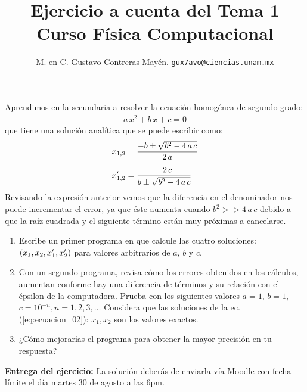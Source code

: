
\usepackage{minted}

\title{\vspace{-2cm}Ejercicio a cuenta del Tema 1 \\ {\large Curso Física Computacional} \vspace{-3ex}}
\author{M. en C. Gustavo Contreras Mayén. \texttt{gux7avo@ciencias.unam.mx}}
\date{}



\fontsize{14}{14}\selectfont
\vspace{-4cm}
\maketitle

Aprendimos en la secundaria a resolver la ecuación homogénea de segundo grado:
\begin{align}
a \, x^{2} + b \, x + c = 0
\label{eq:ecuacion_01}
\end{align}
que tiene una solución analítica que se puede escribir como:
\begin{align}
x_{1,2} &= \dfrac{-b \pm \sqrt{b^{2} - 4 \, a \, c}}{2 \, a} \label{eq:ecuacion_02} \\[0.5em]
{x}^{\prime}_{1,2} &= \dfrac{-2 \, c}{b \pm \sqrt{b^{2} - 4 \, a \, c}} \label{eq:ecuacion_03}
\end{align}
Revisando la expresión anterior vemos que la diferencia en el denominador nos puede incrementar el error, ya que éste aumenta cuando $b^{2} >> 4 \, a \, c$ debido a que la raíz cuadrada y el siguiente término están muy próximas a cancelarse.
\begin{enumerate}
\item Escribe un primer programa en \python{} que calcule las cuatro soluciones: \newline $(x_{1}, x_{2}, {x}^{\prime}_{1}, {x}^{\prime}_{2})$ para valores arbitrarios de $a$, $b$ y $c$.
\item Con un segundo programa, revisa cómo los errores obtenidos en los cálculos, aumentan conforme hay una diferencia de términos y su relación con el épsilon de la computadora. Prueba con los siguientes valores $a = 1$, $b = 1$, $c = 10^{-n}, n = 1, 2, 3, \ldots$ Considera que las soluciones de la ec. (\ref{eq:ecuacion_02}): $x_{1}, x_{2}$ son los valores exactos.
\item ¿Cómo mejorarías el programa para obtener la mayor precisión en tu respuesta?
\end{enumerate}

\textbf{Entrega del ejercicio:} La solución deberás de enviarla vía Moodle con fecha límite el día martes 30 de agosto a las 6pm.
